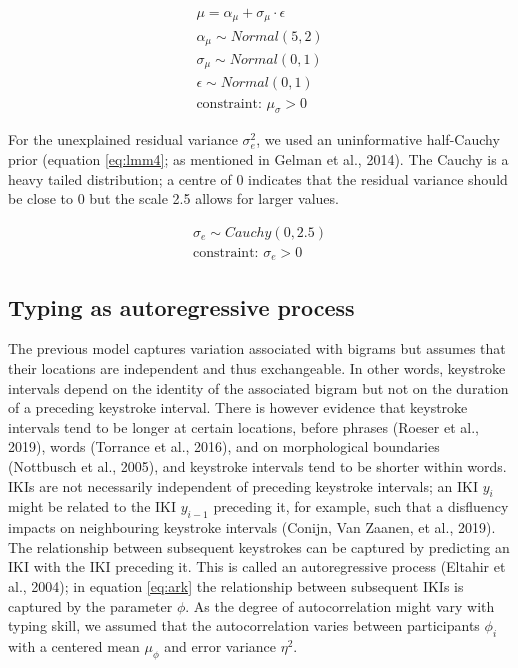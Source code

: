 \documentclass[
  english,
  man,mask,floatsintext]{apa7}
\begin{document}
\[
\tag{4}
\begin{aligned}
\mu = \alpha_{\mu} + \sigma_{\mu} \cdot \epsilon\\
\alpha_{\mu} \sim Normal(5,2)\\
\sigma_{\mu} \sim Normal(0,1)\\
\epsilon \sim Normal(0,1)\\
\text{constraint: }\mu_{\sigma}>0 
\end{aligned}
\label{eq:lmm3}
\]

For the unexplained residual variance \(\sigma_e^2\), we used an uninformative half-Cauchy prior (equation \ref{eq:lmm4}; as mentioned in Gelman et al., 2014). The Cauchy is a heavy tailed distribution; a centre of 0 indicates that the residual variance should be close to 0 but the scale 2.5 allows for larger values.

\[
\tag{5}
\begin{aligned}
\sigma_e \sim Cauchy(0,2.5)\\
\text{constraint: }\sigma_e>0 
\end{aligned}
\label{eq:lmm4}
\]

\hypertarget{typing-as-autoregressive-process}{%
\subsection{Typing as autoregressive process}\label{typing-as-autoregressive-process}}

The previous model captures variation associated with bigrams but assumes that their locations are independent and thus exchangeable. In other words, keystroke intervals depend on the identity of the associated bigram but not on the duration of a preceding keystroke interval. There is however evidence that keystroke intervals tend to be longer at certain locations, before phrases (Roeser et al., 2019), words (Torrance et al., 2016), and on morphological boundaries (Nottbusch et al., 2005), and keystroke intervals tend to be shorter within words. IKIs are not necessarily independent of preceding keystroke intervals; an IKI \(y_{i}\) might be related to the IKI \(y_{i-1}\) preceding it, for example, such that a disfluency impacts on neighbouring keystroke intervals (Conijn, Van Zaanen, et al., 2019). The relationship between subsequent keystrokes can be captured by predicting an IKI with the IKI preceding it. This is called an autoregressive process (Eltahir et al., 2004); in equation \ref{eq:ark} the relationship between subsequent IKIs is captured by the parameter \(\phi\). As the degree of autocorrelation might vary with typing skill, we assumed that the autocorrelation varies between participants \(\phi_i\) with a centered mean \(\mu_{\phi}\) and error variance \(\eta^2\).
\end{document}
